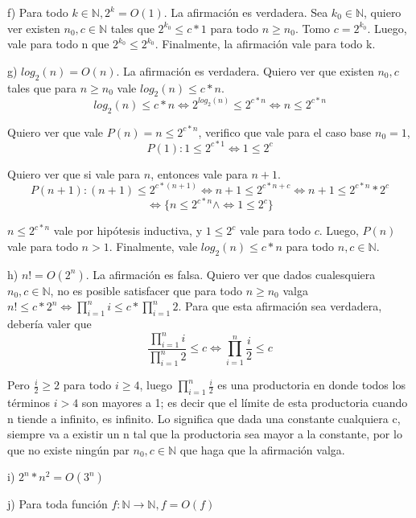 \documentclass[11pt, spanish]{article}
\begin{document}
\vspace{1em}
f) Para todo $k \in \mathbb{N}, 2^k = O(1)$. La afirmación es verdadera. Sea $k_0 \in \mathbb{N}$, quiero ver existen $n_0, c \in \mathbb{N}$ tales que $2^{k_0} \leq c*1$ para todo $n\geq n_0$. Tomo $c=2^{k_0}$. Luego, vale para todo n que $2^{k_0} \leq 2^{k_0}$. Finalmente, la afirmación vale para todo k.

\vspace{1em}
g) $log_2(n) = O(n)$. La afirmación es verdadera. Quiero ver que existen $n_0, c$ tales que para $n\geq n_0$ vale $log_2(n) \leq c*n$.
\[
log_2(n) \leq c*n \iff 2^{log_2(n)} \leq 2^{c*n} \iff n \leq 2^{c*n}
\]

Quiero ver que vale $P(n) = n\leq 2^{c*n}$, verifico que vale para el caso base $n_0=1$,
\[
P(1): 1\leq 2^{c*1} \iff 1\leq 2^c
\]

Quiero ver que si vale para $n$, entonces vale para $n+1$.
\[
P(n+1): (n+1) \leq 2^{c*(n+1)}
\iff n+1 \leq 2^{c*n+c}
\iff n+1 \leq 2^{c*n} * 2^{c}
\]
\[
\iff \{
n \leq 2^{c*n} 
\land
\iff 1 \leq 2^{c}
\}
\]

$n \leq 2^{c*n}$ vale por hipótesis inductiva, y $1 \leq 2^{c}$ vale para todo $c$. Luego, $P(n)$ vale para todo $n>1$. Finalmente, vale $log_2(n) \leq c*n$ para todo $n,c \in \mathbb{N}$.

\vspace{1em}
h) $n! = O(2^n)$. La afirmación es falsa. Quiero ver que dados cualesquiera $n_0, c \in \mathbb{N}$, no es posible satisfacer que para todo $n\geq n_0$ valga $n! \leq c*2^n \iff \prod_{i=1}^{n}i \leq c*\prod_{i=1}^{n}2$. Para que esta afirmación sea verdadera, debería valer que \[
\frac{\prod_{i=1}^{n}i}{\prod_{i=1}^{n}2} \leq c
\iff
\prod_{i=1}^{n}{\frac{i}{2}} \leq c
\]

Pero $\frac{i}{2} \geq 2$ para todo $i\geq4$, luego $\prod_{i=1}^{n}{\frac{i}{2}}$ es una productoria en donde todos los términos $i>4$ son mayores a 1; es decir que el límite de esta productoria cuando n tiende a infinito, es infinito. Lo significa que dada una constante cualquiera c, siempre va a existir un n tal que la productoria sea mayor a la constante, por lo que no existe ningún par $n_0, c \in \mathbb{N}$ que haga que la afirmación valga.

\vspace{1em}
i) $2^n*n^2 = O(3^n)$

\vspace{1em}
j) Para toda función $f: \mathbb{N} \to \mathbb{N}, f=O(f)$
\end{document}
